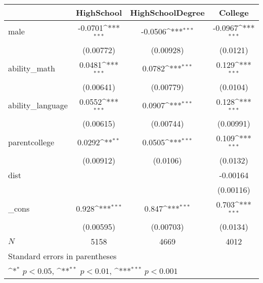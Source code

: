 {
\def\sym#1{\ifmmode^{#1}\else\(^{#1}\)\fi}
\begin{tabular}{l*{3}{c}}
\hline\hline
            &\multicolumn{1}{c}{HighSchool}&\multicolumn{1}{c}{HighSchoolDegree}&\multicolumn{1}{c}{College}\\
\hline
male        &     -0.0701\sym{***}&     -0.0506\sym{***}&     -0.0967\sym{***}\\
            &   (0.00772)         &   (0.00928)         &    (0.0121)         \\
[1em]
ability\_math&      0.0481\sym{***}&      0.0782\sym{***}&       0.129\sym{***}\\
            &   (0.00641)         &   (0.00779)         &    (0.0104)         \\
[1em]
ability\_language&      0.0552\sym{***}&      0.0907\sym{***}&       0.128\sym{***}\\
            &   (0.00615)         &   (0.00744)         &   (0.00991)         \\
[1em]
parentcollege&      0.0292\sym{**} &      0.0505\sym{***}&       0.109\sym{***}\\
            &   (0.00912)         &    (0.0106)         &    (0.0132)         \\
[1em]
dist        &                     &                     &    -0.00164         \\
            &                     &                     &   (0.00116)         \\
[1em]
\_cons      &       0.928\sym{***}&       0.847\sym{***}&       0.703\sym{***}\\
            &   (0.00595)         &   (0.00703)         &    (0.0134)         \\
\hline
\(N\)       &        5158         &        4669         &        4012         \\
\hline\hline
\multicolumn{4}{l}{\footnotesize Standard errors in parentheses}\\
\multicolumn{4}{l}{\footnotesize \sym{*} \(p<0.05\), \sym{**} \(p<0.01\), \sym{***} \(p<0.001\)}\\
\end{tabular}
}
